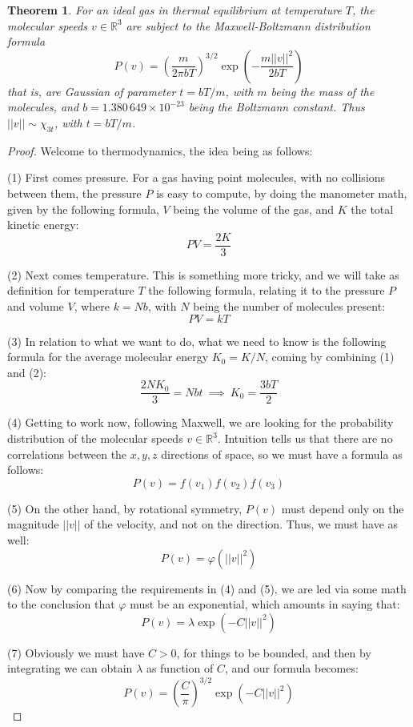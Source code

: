 \documentclass[12pt]{amsbook}
\newtheorem{theorem}{Theorem}[chapter]
\begin{document}
\begin{theorem}
For an ideal gas in thermal equilibrium at temperature $T$, the molecular speeds $v\in\mathbb R^3$ are subject to the Maxwell-Boltzmann distribution formula
$$P(v)=\left(\frac{m}{2\pi bT}\right)^{3/2}\exp\left(-\frac{m||v||^2}{2bT}\right)$$
that is, are Gaussian of parameter $t=bT/m$, with $m$ being the mass of the molecules, and $b=1.380\,649\times 10^{-23}$ being the Boltzmann constant. Thus $||v||\sim\chi_{3t}$, with $t=bT/m$.
\end{theorem}

\begin{proof}
Welcome to thermodynamics, the idea being as follows:

\medskip

(1) First comes pressure. For a gas having point molecules, with no collisions between them, the pressure $P$ is easy to compute, by doing the manometer math, given by the following formula, $V$ being the volume of the gas, and $K$ the total kinetic energy:
$$PV=\frac{2K}{3}$$

(2) Next comes temperature. This is something more tricky, and we will take as definition for temperature $T$ the following formula, relating it to the pressure $P$ and volume $V$, where $k=Nb$, with $N$ being the number of molecules present:
$$PV=kT$$

(3) In relation to what we want to do, what we need to know is the following formula for the average molecular energy $K_0=K/N$, coming by combining (1) and (2):
$$\frac{2NK_0}{3}=Nbt\ \implies\ K_0=\frac{3bT}{2}$$

(4) Getting to work now, following Maxwell, we are looking for the probability distribution of the molecular speeds $v\in\mathbb R^3$. Intuition tells us that there are no correlations between the $x,y,z$ directions of space, so we must have a formula as follows:
$$P(v)=f(v_1)f(v_2)f(v_3)$$

(5) On the other hand, by rotational symmetry, $P(v)$ must depend only on the magnitude $||v||$ of the velocity, and not on the direction. Thus, we must have as well:
$$P(v)=\varphi(||v||^2)$$

(6) Now by comparing the requirements in (4) and (5), we are led via some math to the conclusion that $\varphi$ must be an exponential, which amounts in saying that:
$$P(v)=\lambda\exp\left(-C||v||^2\right)$$

(7) Obviously we must have $C>0$, for things to be bounded, and then by integrating we can obtain $\lambda$ as function of $C$, and our formula becomes:
$$P(v)=\left(\frac{C}{\pi}\right)^{3/2}\exp\left(-C||v||^2\right)$$


\end{proof}
\end{document}
